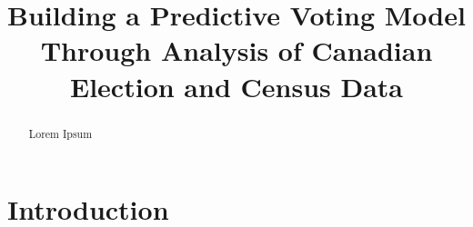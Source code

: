 \documentclass{IEEEtran}
\title{Building a Predictive Voting Model Through Analysis of Canadian Election and Census Data}
\author{
    \IEEEauthorblockN{Mark Lysack, Noah Curoe, Jacob Janzen, and Mia Battad}
}
\begin{document}
\maketitle
\begin{abstract}
    Lorem Ipsum
\end{abstract}
\section{Introduction}
\end{document}
